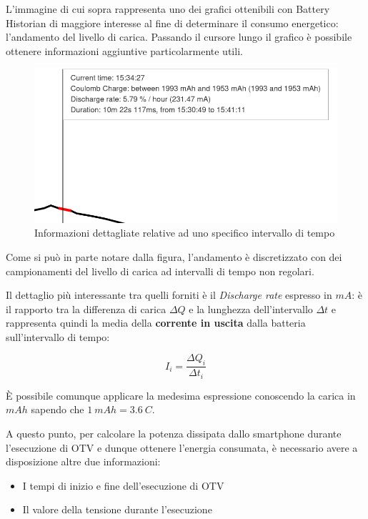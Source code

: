 L'immagine di cui sopra rappresenta uno dei grafici ottenibili con Battery Historian di maggiore interesse al fine di
determinare il consumo energetico: l'andamento del livello di carica. Passando il cursore lungo il grafico è possibile
ottenere informazioni aggiuntive particolarmente utili.

\begin{figure}[h!]
    \begin{center}
        \includegraphics[scale=0.5]{img/battery_historian_hover.png}
        \caption{Informazioni dettagliate relative ad uno specifico intervallo di tempo}
    \end{center}
\end{figure}

Come si può in parte notare dalla figura, l'andamento è discretizzato con dei campionamenti del livello di carica ad 
intervalli di tempo non regolari.

Il dettaglio più interessante tra quelli forniti è il \textit{Discharge rate} espresso in $mA$: è il rapporto tra la differenza
di carica $\Delta Q$ e la lunghezza dell'intervallo $\Delta t$ e rappresenta quindi la media della \textbf{corrente in uscita} 
dalla batteria sull'intervallo di tempo:

\begin{equation*}
    I_{i} = \frac{\Delta Q_i}{\Delta t_i}
\end{equation*}

È possibile comunque applicare la medesima espressione conoscendo la carica in $mAh$ sapendo che $1~mAh = 3.6~C$.

A questo punto, per calcolare la potenza dissipata dallo smartphone durante l'esecuzione di OTV e dunque ottenere l'energia 
consumata, è necessario avere a disposizione altre due informazioni:
\begin{itemize}
    \item I tempi di inizio e fine dell'esecuzione di OTV
    \item Il valore della tensione durante l'esecuzione
\end{itemize}

